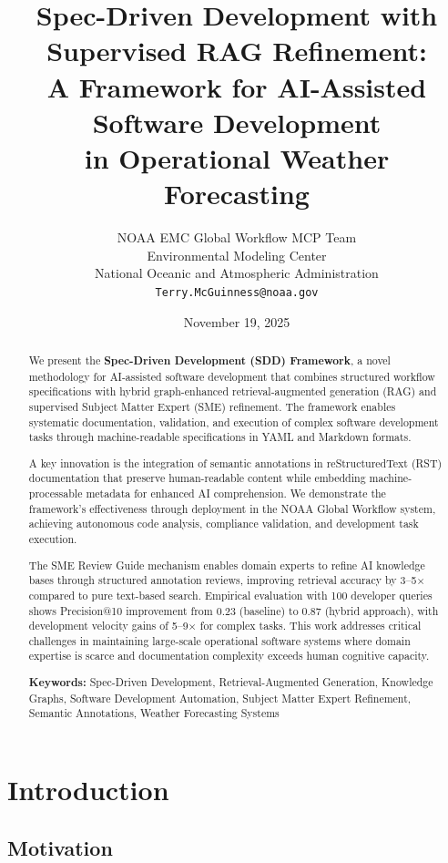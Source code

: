 \documentclass[11pt,letterpaper]{article}
\title{\textbf{Spec-Driven Development with Supervised RAG Refinement:} \\
       \textbf{A Framework for AI-Assisted Software Development} \\
       \textbf{in Operational Weather Forecasting}}
\author{
    NOAA EMC Global Workflow MCP Team \\
    Environmental Modeling Center \\
    National Oceanic and Atmospheric Administration \\
    \texttt{Terry.McGuinness@noaa.gov}
}
\date{November 19, 2025}
\begin{document}
\maketitle

\begin{abstract}
We present the \textbf{Spec-Driven Development (SDD) Framework}, a novel methodology for AI-assisted software development that combines structured workflow specifications with hybrid graph-enhanced retrieval-augmented generation (RAG) and supervised Subject Matter Expert (SME) refinement. The framework enables systematic documentation, validation, and execution of complex software development tasks through machine-readable specifications in YAML and Markdown formats. 

A key innovation is the integration of semantic annotations in reStructuredText (RST) documentation that preserve human-readable content while embedding machine-processable metadata for enhanced AI comprehension. We demonstrate the framework's effectiveness through deployment in the NOAA Global Workflow system, achieving autonomous code analysis, compliance validation, and development task execution. 

The SME Review Guide mechanism enables domain experts to refine AI knowledge bases through structured annotation reviews, improving retrieval accuracy by 3--5$\times$ compared to pure text-based search. Empirical evaluation with 100 developer queries shows Precision@10 improvement from 0.23 (baseline) to 0.87 (hybrid approach), with development velocity gains of 5--9$\times$ for complex tasks. This work addresses critical challenges in maintaining large-scale operational software systems where domain expertise is scarce and documentation complexity exceeds human cognitive capacity.

\textbf{Keywords:} Spec-Driven Development, Retrieval-Augmented Generation, Knowledge Graphs, Software Development Automation, Subject Matter Expert Refinement, Semantic Annotations, Weather Forecasting Systems
\end{abstract}

\section{Introduction}

\subsection{Motivation}
\end{document}
